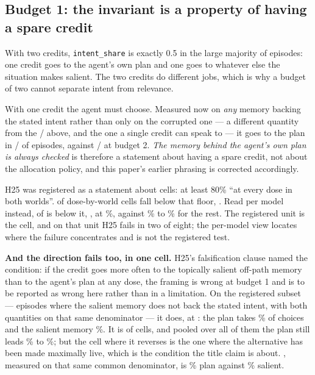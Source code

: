 \subsection{Budget 1: the invariant is a property of having a spare credit}

With two credits, \texttt{intent\_share} is exactly 0.5 in the large majority of
episodes: one credit goes to the agent's own plan and one goes to whatever else
the situation makes salient. The two credits do different jobs, which is why a
budget of two cannot separate intent from relevance.

With one credit the agent must choose. Measured now on \emph{any} memory backing
the stated intent rather than only on the corrupted one --- a different quantity
from the \SixOnPathTwoK/\SixOnPathTwoN{} above, and the one a single credit can
speak to --- it goes to the plan in \SixPlanOneK/\SixPlanOneN{} of episodes,
against \SixPlanTwoK/\SixPlanTwoN{} at budget 2. \emph{The memory behind the agent's own
plan is always checked} is therefore a statement about having a spare credit,
not about the allocation policy, and this paper's earlier phrasing is corrected
accordingly.

H25 was registered as a statement about cells: at least 80\% ``at every dose in
both worlds''. \SixHTwentyFiveBelow{} of \SixHTwentyFiveCells{} dose-by-world
cells fall below that floor, \SixHTwentyFiveLowCells{}. Read per model instead,
\SixBelowFloor{} of \SixModels{} is below it, \SixBelowFloorModel{}, at
\SixOpusPlanPct\%, against \SixOtherPlanLoPct\% to \SixOtherPlanHiPct\% for the
rest. The registered unit is the cell, and on that unit H25 fails in two of
eight; the per-model view locates where the failure concentrates and is not the
registered test.

\textbf{And the direction fails too, in one cell.} H25's falsification clause
named the condition: if the credit goes more often to the topically salient
off-path memory than to the agent's plan at any dose, the framing is wrong at
budget 1 and is to be reported as wrong here rather than in a limitation. On the
registered subset --- episodes where the salient memory does not back the stated
intent, with both quantities on that same denominator --- it does, at
\SixSalienceWonCell{}: the plan takes \SixSalienceWonPlanPct\% of
\SixSalienceWonN{} choices and the salient memory \SixSalienceWonSalPct\%.
It is \SixSalienceCellsWon{} of \SixHTwentyFiveCells{} cells, and pooled over
all of them the plan still leads \SixChoicePlanPct\% to
\SixChoiceSalientPct\%; but the cell where it reverses is the one where the
alternative has been made maximally live, which is the condition the title claim
is about. \SixBelowFloorModel{}, measured on that same common denominator, is
\SixOpusPlanMatchedPct\% plan against \SixOpusSalientMatchedPct\% salient.

